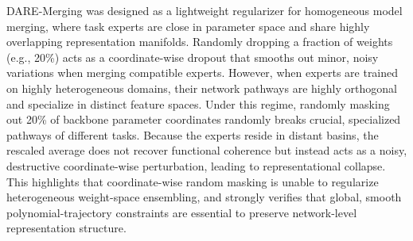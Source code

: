 DARE-Merging was designed as a lightweight regularizer for homogeneous model merging, where task experts are close in parameter space and share highly overlapping representation manifolds. Randomly dropping a fraction of weights (e.g., 20\%) acts as a coordinate-wise dropout that smooths out minor, noisy variations when merging compatible experts. However, when experts are trained on highly heterogeneous domains, their network pathways are highly orthogonal and specialize in distinct feature spaces. Under this regime, randomly masking out 20\% of backbone parameter coordinates randomly breaks crucial, specialized pathways of different tasks. Because the experts reside in distant basins, the rescaled average does not recover functional coherence but instead acts as a noisy, destructive coordinate-wise perturbation, leading to representational collapse. This highlights that coordinate-wise random masking is unable to regularize heterogeneous weight-space ensembling, and strongly verifies that global, smooth polynomial-trajectory constraints are essential to preserve network-level representation structure.

